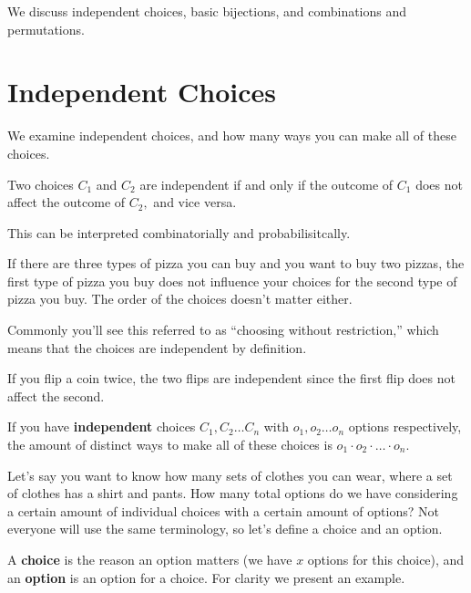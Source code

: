 \documentclass[blue,onecol]{shooting}
\begin{document}
We discuss independent choices, basic bijections, and combinations and permutations.

\section{Independent Choices}

We examine independent choices, and how many ways you can make all of these choices.

\begin{defi}
Two choices $C_1$ and $C_2$ are independent if and only if the outcome of $C_1$ does not affect the outcome of $C_2,$ and vice versa.
\end{defi}

This can be interpreted combinatorially and probabilisitcally.

\begin{exam}
If there are three types of pizza you can buy and you want to buy two pizzas, the first type of pizza you buy does not influence your choices for the second type of pizza you buy. The order of the choices doesn't matter either.
\end{exam}

Commonly you'll see this referred to as ``choosing without restriction,'' which means that the choices are independent by definition.

\begin{exam}
If you flip a coin twice, the two flips are independent since the first flip does not affect the second.
\end{exam}

\begin{theo}
If you have \textbf{independent} choices $C_1,C_2\dots C_n$ with $o_1,o_2\dots o_n$ options respectively, the amount of distinct ways to make all of these choices is $o_1\cdot o_2\cdot\dots\cdot o_n.$
\end{theo}

Let's say you want to know how many sets of clothes you can wear, where a set of clothes has a shirt and pants. How many total options do we have considering a certain amount of individual choices with a certain amount of options? Not everyone will use the same terminology, so let's define a choice and an option.

\begin{defi}
A \textbf{choice} is the reason an option matters (we have $x$ options for this choice), and an \textbf{option} is an option for a choice. For clarity we present an example.
\end{defi}
\end{document}
